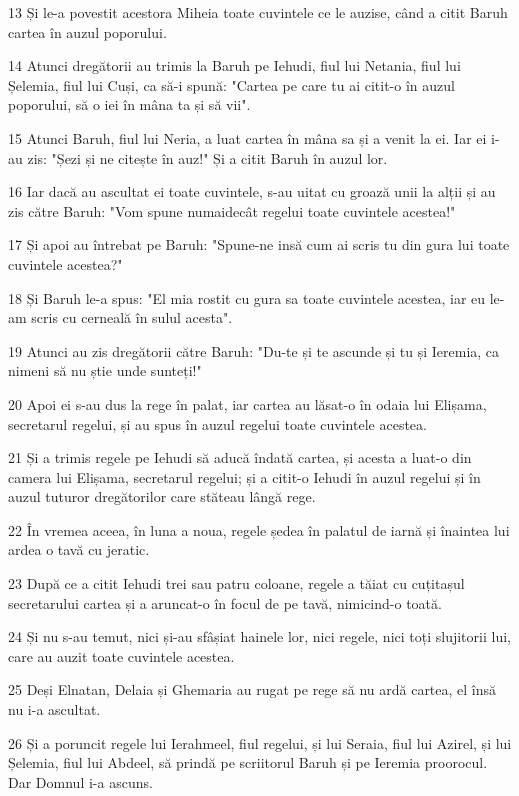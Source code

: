 \par 13 Și le-a povestit acestora Miheia toate cuvintele ce le auzise, când a citit Baruh cartea în auzul poporului.
\par 14 Atunci dregătorii au trimis la Baruh pe Iehudi, fiul lui Netania, fiul lui Șelemia, fiul lui Cuși, ca să-i spună: "Cartea pe care tu ai citit-o în auzul poporului, să o iei în mâna ta și să vii".
\par 15 Atunci Baruh, fiul lui Neria, a luat cartea în mâna sa și a venit la ei. Iar ei i-au zis: "Șezi și ne citește în auz!" Și a citit Baruh în auzul lor.
\par 16 Iar dacă au ascultat ei toate cuvintele, s-au uitat cu groază unii la alții și au zis către Baruh: "Vom spune numaidecât regelui toate cuvintele acestea!"
\par 17 Și apoi au întrebat pe Baruh: "Spune-ne insă cum ai scris tu din gura lui toate cuvintele acestea?"
\par 18 Și Baruh le-a spus: "El mia rostit cu gura sa toate cuvintele acestea, iar eu le-am scris cu cerneală în sulul acesta".
\par 19 Atunci au zis dregătorii către Baruh: "Du-te și te ascunde și tu și Ieremia, ca nimeni să nu știe unde sunteți!"
\par 20 Apoi ei s-au dus la rege în palat, iar cartea au lăsat-o în odaia lui Elișama, secretarul regelui, și au spus în auzul regelui toate cuvintele acestea.
\par 21 Și a trimis regele pe Iehudi să aducă îndată cartea, și acesta a luat-o din camera lui Elișama, secretarul regelui; și a citit-o Iehudi în auzul regelui și în auzul tuturor dregătorilor care stăteau lângă rege.
\par 22 În vremea aceea, în luna a noua, regele ședea în palatul de iarnă și înaintea lui ardea o tavă cu jeratic.
\par 23 După ce a citit Iehudi trei sau patru coloane, regele a tăiat cu cuțitașul secretarului cartea și a aruncat-o în focul de pe tavă, nimicind-o toată.
\par 24 Și nu s-au temut, nici și-au sfâșiat hainele lor, nici regele, nici toți slujitorii lui, care au auzit toate cuvintele acestea.
\par 25 Deși Elnatan, Delaia și Ghemaria au rugat pe rege să nu ardă cartea, el însă nu i-a ascultat.
\par 26 Și a poruncit regele lui Ierahmeel, fiul regelui, și lui Seraia, fiul lui Azirel, și lui Șelemia, fiul lui Abdeel, să prindă pe scriitorul Baruh și pe Ieremia proorocul. Dar Domnul i-a ascuns.
